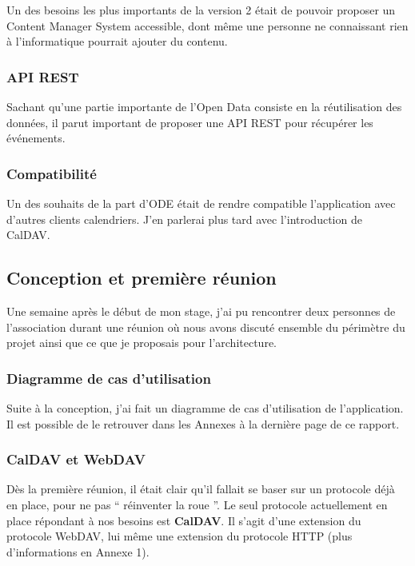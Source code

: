 Un des besoins les plus importants de la version 2 était de pouvoir proposer un Content Manager System accessible, dont même une personne ne connaissant rien à l'informatique pourrait ajouter du contenu.

\subsubsection*{API REST}

Sachant qu'une partie importante de l'Open Data consiste en la réutilisation des données, il parut important de proposer une API REST pour récupérer les événements.

\subsubsection*{Compatibilité}

Un des souhaits de la part d'ODE était de rendre compatible l'application avec d'autres clients calendriers. J'en parlerai plus tard avec l'introduction de CalDAV.

\subsection{Conception et première réunion}

Une semaine après le début de mon stage, j'ai pu rencontrer deux personnes de l'association durant une réunion où nous avons discuté ensemble du périmètre du projet ainsi que ce que je proposais pour l'architecture.

\subsubsection*{Diagramme de cas d'utilisation}

Suite à la conception, j'ai fait un diagramme de cas d'utilisation de l'application. Il est possible de le retrouver dans les Annexes à la dernière page de ce rapport.

\subsubsection*{CalDAV et WebDAV}

Dès la première réunion, il était clair qu'il fallait se baser sur un protocole déjà en place, pour ne pas `` réinventer la roue ''. Le seul protocole actuellement en place répondant à nos besoins est \textbf{CalDAV}. Il s'agit d'une extension du protocole WebDAV, lui même une extension du protocole HTTP (plus d'informations en Annexe 1). 

